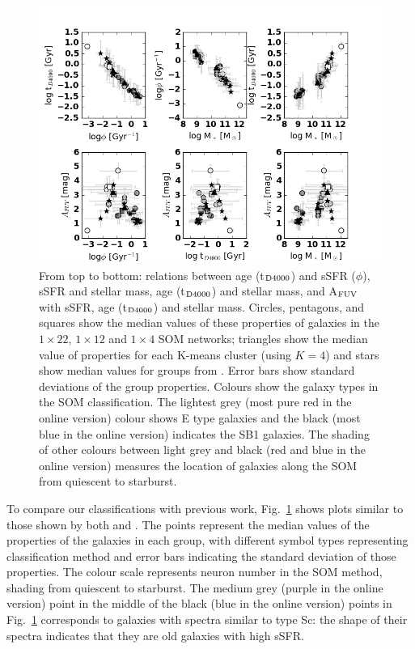         \begin{figure}
\includegraphics[width=\textwidth]{images0.01/1d/fig11_new_bw.png}
        \caption{
        From top to bottom: relations between age (t$_{\rm {D4000}}$) and sSFR ($\phi$), sSFR and stellar mass, age (t$_{\rm {D4000}}$) and stellar mass, and A$_{\rm {FUV}}$ with sSFR, age (t$_{\rm {D4000}}$) and stellar mass. 
        Circles, pentagons, and squares show the median values of these properties of galaxies in the $1\times22$, $1\times 12$ and $1\times4$ SOM networks; 
        triangles show the median value of properties for each K-means cluster (using $K=4$) and stars show median values for groups from .
        Error bars show standard deviations of the group properties.
        Colours show the galaxy types in the SOM classification. 
        The lightest grey (most pure red in the online version) colour shows E type galaxies and the black (most blue in the online version) indicates the SB1 galaxies. 
        The shading of other colours between light grey and black (red and blue in the online version) measures the location of galaxies along the SOM from  quiescent to starburst.}
        \label{fig: props_vs_props}
        \end{figure}
    
        To compare our classifications with previous work, Fig.~\ref{fig: props_vs_props} shows plots similar to those shown by both  and .
        The points represent the median values of the properties of the galaxies in each group, with different symbol types representing classification method and error bars indicating the standard deviation of those properties.
       The colour scale represents neuron number in the SOM method, shading from quiescent to starburst. 
        The medium grey (purple in the online version) point in the middle of the black (blue in the online version) points in Fig.~\ref{fig: props_vs_props} corresponds to galaxies with spectra similar to type Sc: the shape of their spectra indicates that they are old galaxies with high sSFR.
        
